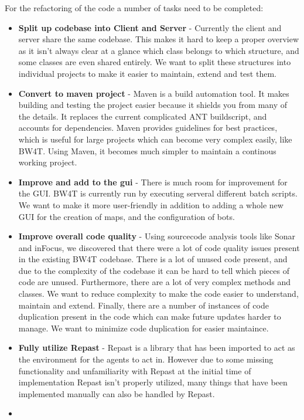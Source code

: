 For the refactoring of the code a number of tasks need to be completed:
\begin{itemize}
  \item
  \textbf{Split up codebase into Client and Server} - Currently the client and
  server share the same codebase. This makes it hard to keep a proper overview as
  it isn't always clear at a glance which class belongs to which structure, and
  some classes are even shared entirely. We want to split these structures into
  individual projects to make it easier to maintain, extend and test them. 
  \item
  \textbf{Convert to \Gls{maven} project} - Maven is a build automation tool. It makes building and testing the project easier because it shields you from many of the details. It replaces the current complicated ANT buildscript, and accounts for dependencies. Maven provides guidelines for best practices, which is useful for large projects which can become very complex easily, like BW4T. Using Maven, it becomes much simpler to maintain a continous working project.
  \item
  \textbf{Improve and add to the \gls{gui}} - There is much room for improvement for
  the GUI. BW4T is currently run by executing serveral different batch scripts. We want to make it more user-friendly in addition to adding a whole
  new GUI for the creation of maps, and the configuration of bots. 
  \item
  \textbf{Improve overall code quality} - Using sourcecode analysis tools like Sonar and inFocus, we discovered that there were a lot of code quality issues present in the existing BW4T codebase. There is a lot of unused code present, and due to the
  complexity of the codebase it can be hard to tell which pieces of code are
  unused. Furthermore, there are a lot of very complex methods and classes. We want to reduce complexity to make the code easier to understand, maintain and extend.
  Finally, there are a number of instances of code duplication present in the code which can make future updates harder to manage. We want to minimize code duplication for easier maintaince. 
  \item
  \textbf{Fully utilize Repast} - Repast is a library that has been imported to
  act as the environment for the agents to act in. However due to some missing
  functionality and unfamiliarity with Repast at the initial time of implementation
  Repast isn't properly utilized, many things that have been implemented manually
  can also be handled by Repast.
  \item

\end{itemize}

